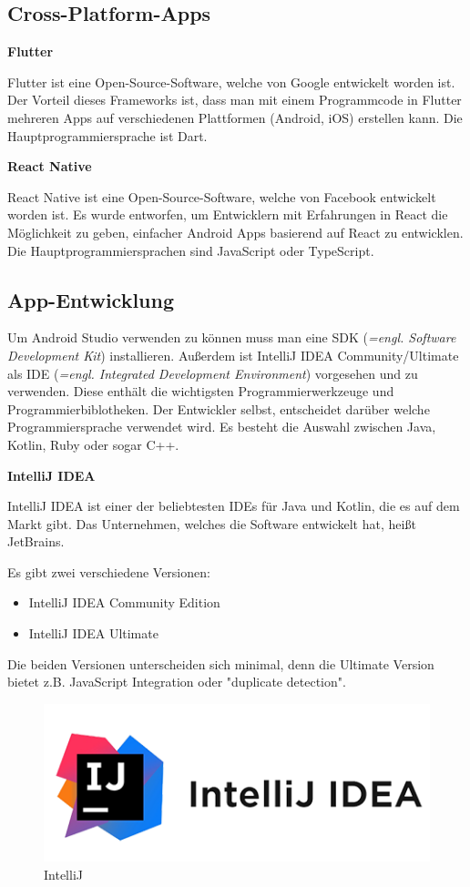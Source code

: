 \subsection{Cross-Platform-Apps}

\textbf{Flutter}

Flutter ist eine Open-Source-Software, welche von Google entwickelt worden ist.\textcite{Flutter} Der Vorteil dieses Frameworks ist, dass man mit einem Programmcode in Flutter mehreren Apps auf verschiedenen Plattformen (Android, iOS) erstellen kann. Die Hauptprogrammiersprache ist Dart.

\textbf{React Native}

React Native ist eine Open-Source-Software, welche von Facebook entwickelt worden ist. \textcite{ReactNative} Es wurde entworfen, um Entwicklern mit Erfahrungen in React die Möglichkeit zu geben, einfacher Android Apps basierend auf React zu entwicklen. Die Hauptprogrammiersprachen sind JavaScript oder TypeScript.

\subsection{App-Entwicklung}

Um Android Studio verwenden zu können muss man eine SDK (\textit{=engl. Software Development Kit}) installieren. Außerdem ist IntelliJ IDEA Community/Ultimate als IDE (\textit{=engl. Integrated Development Environment}) vorgesehen und zu verwenden. Diese enthält die wichtigsten Programmierwerkzeuge und Programmierbiblotheken. Der Entwickler selbst, entscheidet darüber welche Programmiersprache verwendet wird. Es besteht die Auswahl zwischen Java, Kotlin, Ruby oder sogar C++.


\textbf{IntelliJ IDEA}

IntelliJ IDEA ist einer der beliebtesten IDEs für Java und Kotlin, die es auf dem Markt gibt. Das Unternehmen, welches die Software entwickelt hat, heißt JetBrains. 

Es gibt zwei verschiedene Versionen:
\begin{itemize}
	\item IntelliJ IDEA Community Edition
	\item IntelliJ IDEA Ultimate
\end{itemize}

Die beiden Versionen unterscheiden sich minimal, denn die Ultimate Version bietet z.B. JavaScript Integration oder "duplicate detection".

\begin{figure} [H]
	\centering
	\includegraphics[width=0.5\linewidth]{images/intelliJ.png}
	\caption[IntelliJ]{IntelliJ}
	\vspace{1cm}
	\label{fig:IntelliJ}
\end{figure}


